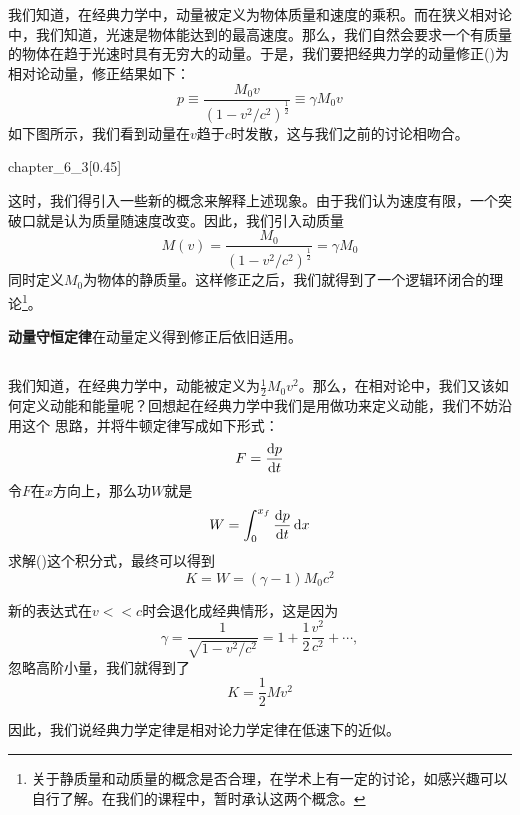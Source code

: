 \section[相对论能动量]{}
\subsection[相对论动量]{}
我们知道，在经典力学中，动量被定义为物体质量和速度的乘积。而在狭义相对论中，我们知道，光速是物体能达到的最高速度。那么，我们自然会要求一个有质量的物体在趋于光速时具有无穷大的动量。于是，我们要把经典力学的动量修正()为相对论动量，修正结果如下：
\[p\equiv\frac{M_0v}{\left(1-v^{2}/c^{2}\right)^{\frac{1}{2}}}\equiv\gamma M_0 v\]
如下图所示，我们看到动量在$v$趋于$c$时发散，这与我们之前的讨论相吻合。
\begin{singlefigure}{chapter_6_3}[0.45] 
\end{singlefigure}
这时，我们得引入一些新的概念来解释上述现象。由于我们认为速度有限，一个突破口就是认为质量随速度改变。因此，我们引入动质量
\[M(v)=\frac{M_0}{\left(1-v^{2}/c^{2}\right)^{\frac{1}{2}}}=\gamma M_0\]
同时定义$M_0$为物体的静质量。这样修正之后，我们就得到了一个逻辑环闭合的理论\footnote{关于静质量和动质量的概念是否合理，在学术上有一定的讨论，如感兴趣可以自行了解。在我们的课程中，暂时承认这两个概念。}。

\textbf{动量守恒定律}在动量定义得到修正后依旧适用。
\subsection[相对论能量]{}
我们知道，在经典力学中，动能被定义为$\frac{1}{2}M_0v^2$。那么，在相对论中，我们又该如何定义动能和能量呢？回想起在经典力学中我们是用做功来定义动能，我们不妨沿用这个
思路，并将牛顿定律写成如下形式：
\[F=\frac{\dif p}{\dif t}\]
令$F$在$x$方向上，那么功$W$就是
\[W=\int_0^{x_f} \dfrac{\dif p}{\dif t}\dif x\]
求解()这个积分式，最终可以得到
\begin{equation}
	K=W=(\gamma -1)M_0c^2
\end{equation}

新的表达式在$v<<c$时会退化成经典情形，这是因为
\[\gamma=\frac{1}{\sqrt{1-v^2/c^2}}=1+\frac{1}{2}\frac{v^2}{c^2}+\cdots,\]
忽略高阶小量，我们就得到了
\[K=\frac{1}{2}Mv^2\]

因此，我们说经典力学定律是相对论力学定律在低速下的近似。

